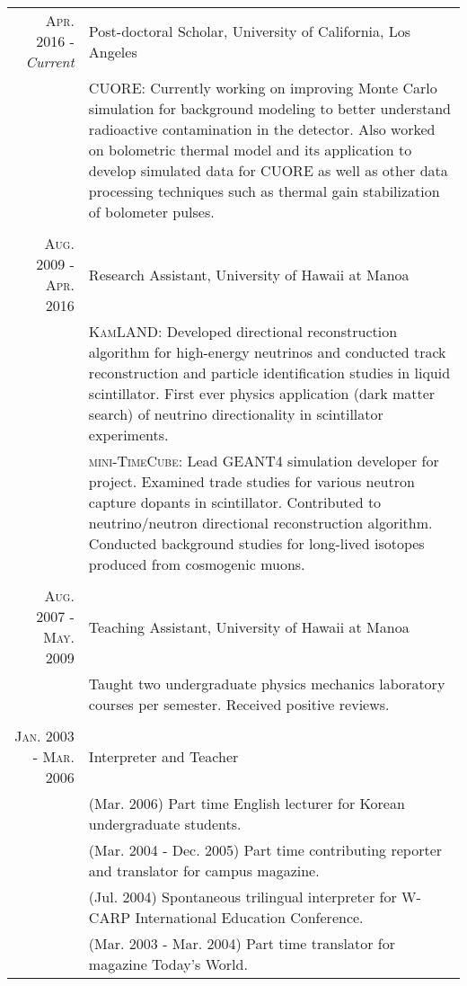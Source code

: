 \documentclass[a4paper,10pt]{article} %
\begin{document}
\begin{tabular}{r|p{10.4cm}}
\textsc{Apr. 2016 - }\textit{Current} & Post-doctoral Scholar, University of California, Los Angeles\\
& \footnotesize{
	\textsc{CUORE}: Currently working on improving Monte Carlo simulation for
	background modeling to better understand radioactive contamination in the
	detector. Also worked on bolometric thermal model and its application to
	develop simulated data for CUORE as well as other data processing
	techniques such as thermal gain stabilization of bolometer pulses.
}\\
\multicolumn{2}{c}{} \\


\textsc{Aug. 2009 - Apr. 2016} & Research Assistant, University of Hawaii at Manoa\\
& \footnotesize{
	\textsc{KamLAND}: Developed directional reconstruction algorithm for
	high-energy neutrinos and conducted track reconstruction and
	particle identification studies in liquid scintillator.
	First ever physics application (dark matter search) of neutrino
	directionality in scintillator experiments.
}\\
& \footnotesize{
	\textsc{mini-TimeCube}: Lead GEANT4 simulation developer for project.
	Examined trade studies for various neutron capture dopants in
	scintillator.
	Contributed to neutrino/neutron directional reconstruction algorithm.
	Conducted background studies for long-lived isotopes produced from
	cosmogenic muons.
}\\
\multicolumn{2}{c}{} \\


\textsc{Aug. 2007 - May. 2009} & Teaching Assistant, University of Hawaii at Manoa\\
& \footnotesize{
	Taught two undergraduate physics mechanics laboratory courses per semester.
	Received positive reviews.
}\\
\multicolumn{2}{c}{} \\


\textsc{Jan. 2003 - Mar. 2006} & Interpreter and Teacher\\
& \footnotesize{(Mar. 2006) Part time English lecturer for Korean undergraduate
students.}\\
& \footnotesize{(Mar. 2004 - Dec. 2005) Part time contributing reporter and
translator for campus magazine.}\\
& \footnotesize{(Jul. 2004) Spontaneous trilingual interpreter for W-CARP
International Education Conference.}\\
& \footnotesize{(Mar. 2003 - Mar. 2004) Part time translator for magazine Today's World.}\\
\end{tabular}
\end{document}
